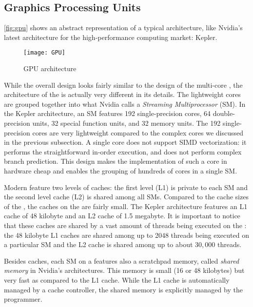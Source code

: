 \subsection{Graphics Processing Units}
\autoref{fig:gpu} shows an abstract representation of a typical \GPU architecture, like Nvidia's latest \GPU architecture for the high-performance computing market: Kepler.
\begin{figure}
  \centering
  \texttt{[image: GPU]}
  \caption{GPU architecture}
  \label{fig:gpu}
\end{figure}
While the overall design looks fairly similar to the design of the multi-core \CPU, the architecture of the \GPU is actually very different in its details.
The lightweight \GPU cores are grouped together into what Nvidia calls a \emph{Streaming Multiprocessor} (SM).
In the Kepler architecture, an SM features 192 single-precision cores, 64 double-precision units, 32 special function units, and 32 memory units.
The 192 single-precision cores are very lightweight compared to the complex \CPU cores we discussed in the previous subsection.
A single \GPU core does not support SIMD vectorization:
it performs the straightforward in-order execution, and does not perform complex branch prediction.
This design makes the implementation of such a core in hardware cheap and enables the grouping of hundreds of cores in a single SM.

Modern \GPUs feature two levels of caches:
the first level (L1) is private to each SM and the second level cache (L2) is shared among all SMs.
Compared to the cache sizes of the \CPU, the caches on the \GPU are fairly small.
The Kepler architecture features an L1 cache of 48 kilobyte and an L2 cache of 1.5 megabyte.
It is important to notice that these caches are shared by a vast amount of threads being executed on the \GPU:
the 48 kilobyte L1 caches are shared among up to 2048 threads being executed on a particular SM and the L2 cache is shared among up to about 30,\,000 threads.

Besides caches, each SM on a \GPU features also a scratchpad memory, called \emph{shared memory} in Nvidia's \GPU architectures.
This memory is small (16 or 48 kilobytes) but very fast as compared to the L1 cache.
While the L1 cache is automatically managed by a cache controller, the shared memory is explicitly managed by the programmer.

